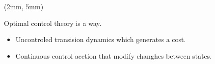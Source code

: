 \begin{frame}{}
    \begin{textblock*}{55mm}(2mm, 5mm)
        \begin{beamerboxesrounded}{Optimal control theory is a way.}
            \begin{itemize}
                \item
                    Uncontroled transision dynamics which generates a cost.
                \item
                    Continuous control acction that modify changhes between
                    states.
            \end{itemize}
        \end{beamerboxesrounded}
    \end{textblock*}

    \begin{bibunit}[apalike]
        \nocite{Wickwire1977}
        \putbib
    \end{bibunit}
\end{frame}
